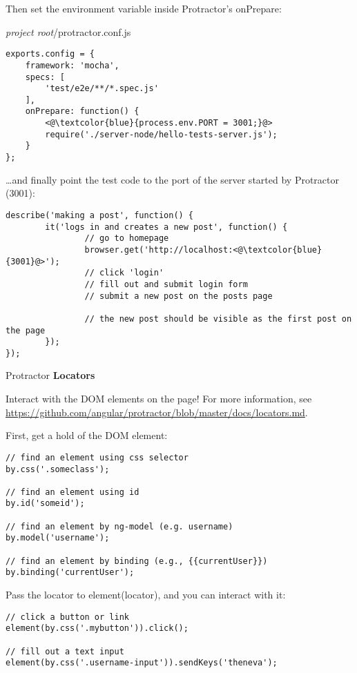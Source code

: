 \documentclass[british]{article}
\begin{document}
Then set the environment variable inside Protractor's onPrepare:

\textit{project root}/protractor.conf.js

\begin{lstlisting}
exports.config = {
    framework: 'mocha',
    specs: [
        'test/e2e/**/*.spec.js'
    ],
    onPrepare: function() {
        <@\textcolor{blue}{process.env.PORT = 3001;}@>
        require('./server-node/hello-tests-server.js');
    }
};
\end{lstlisting}

\dots and finally point the test code to the port of the server started by Protractor (3001):

\begin{lstlisting}
describe('making a post', function() {
        it('logs in and creates a new post', function() {
                // go to homepage
                browser.get('http://localhost:<@\textcolor{blue}{3001}@>');
                // click 'login'
                // fill out and submit login form
                // submit a new post on the posts page

                // the new post should be visible as the first post on the page
        });
});
\end{lstlisting}

Protractor \textbf{Locators}

Interact with the DOM elements on the page! For more information, see \url{https://github.com/angular/protractor/blob/master/docs/locators.md}.

First, get a hold of the DOM element:

\begin{lstlisting}
// find an element using css selector
by.css('.someclass');

// find an element using id
by.id('someid');

// find an element by ng-model (e.g. username)
by.model('username');

// find an element by binding (e.g., {{currentUser}})
by.binding('currentUser');
\end{lstlisting}

Pass the locator to element(locator), and you can interact with it:

\begin{lstlisting}
// click a button or link
element(by.css('.mybutton')).click();

// fill out a text input
element(by.css('.username-input')).sendKeys('theneva');
\end{lstlisting}
\end{document}

